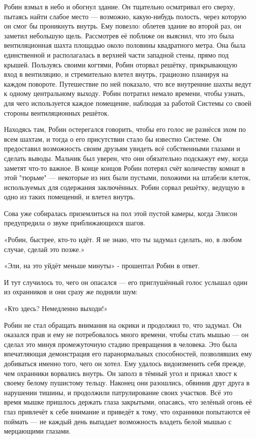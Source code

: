 \documentclass[a4paper,12pt]{book}
\begin{document}
\par
Робин взмыл в небо и обогнул здание. Он тщательно осматривал его сверху, пытаясь найти слабое место — возможно, какую-нибудь полость, через которую он смог бы проникнуть внутрь. Ему повезло: облетев здание во второй раз, он заметил небольшую щель. Рассмотрев её поближе он выяснил, что это была вентиляционная шахта площадью около половины квадратного метра. Она была единственной и располагалась в верхней части западной стены, прямо под крышей. Пользуясь своими когтями, Робин оторвал решётку, прикрывающую вход в вентиляцию, и стремительно влетел внутрь, грациозно планируя на каждом повороте. Путешествие по ней показало, что все внутренние шахты ведут к одному центральному выходу. Робин потратил немало времени, чтобы узнать, для чего используется каждое помещение, наблюдая за работой Системы со своей стороны вентиляционных решёток.
\par
Находясь там, Робин остерегался говорить, чтобы его голос не разнёсся эхом по всем шахтам, и тогда о его присутствии стало бы известно Системе. Он предоставил возможность своим друзьям увидеть всё собственными глазами и сделать выводы. Мальчик был уверен, что они обязательно подскажут ему, когда заметят что-то важное. В конце концов Робин потерял счёт количеству комнат в этой "тюрьме" — некоторые из них были пустыми, похожими на штабели клеток, используемых для содержания заключённых. Робин сорвал решётку, ведущую в одно из таких помещений, и влетел внутрь.\\
\par
Сова уже собиралась приземлиться на пол этой пустой камеры, когда Элисон предупредила о звуке приближающихся шагов.
\par
«Робин, быстрее, кто-то идёт. Я не знаю, что ты задумал сделать, но, в любом случае, сделай это позже.»
\par
«Эли, на это уйдёт меньше минуты» - прошептал Робин в ответ.
\par
И тут случилось то, чего он опасался — его приглушённый голос услышал один из охранников и они сразу же подняли шум:
\par
«Кто здесь? Немедленно выходи!»
\par
Робин не стал обращать внимания на окрики и продолжил то, что задумал. Он оказался прав и ему не потребовалось много времени, чтобы стать мышью — он сделал это минуя промежуточную стадию превращения в человека. Это была впечатляющая демонстрация его паранормальных способностей, позволявших ему добиваться именно того, чего он хотел. Ему удалось видоизменить себя прежде, чем охранники ворвались внутрь. Он заполз в тёмный угол и прижал хвост к своему белому пушистому тельцу. Наконец они разошлись, обвинив друг друга в нарушении тишины, и продолжили патрулирование своих участков. Всё это время мышке пришлось держать глаза закрытыми, опасаясь, что зелёный огонь её глаз привлечёт к себе внимание и приведёт к тому, что охранники попытаются её поймать — не каждый день выпадает возможность владеть белой мышью с мерцающими глазами.
\end{document}
